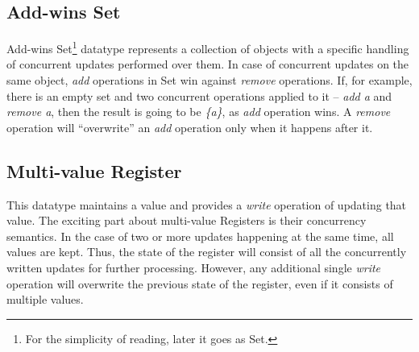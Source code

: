 \subsection*{Add-wins Set}

Add-wins Set\footnote{For the simplicity of reading, later it goes as Set.} datatype represents a collection of objects with a specific handling of concurrent updates performed over them. In case of concurrent updates on the same object, \textit{add} operations in Set win against \textit{remove} operations. If, for example, there is an empty set \textit{} and two concurrent operations applied to it -- \textit{add a} and \textit{remove a}, then the result is going to be \textit{\{a\}}, as \textit{add} operation wins. A \textit{remove} operation will ``overwrite'' an \textit{add} operation only when it happens after it\cite{3}. 

\subsection*{Multi-value Register}

This datatype maintains a value and provides a \textit{write} operation of updating that value. The exciting part about multi-value Registers is their concurrency semantics. In the case of two or more updates happening at the same time, all values are kept. Thus, the state of the register will consist of all the concurrently written updates for further processing. However, any additional single \textit{write} operation will overwrite the previous state of the register, even if it consists of multiple values\cite{39}.